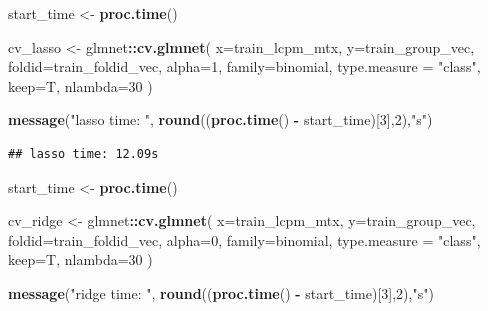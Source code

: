 \documentclass[
]{book}
\newenvironment{Shaded}{\begin{snugshade}}{\end{snugshade}}
\newcommand{\DataTypeTok}[1]{\textcolor[rgb]{0.13,0.29,0.53}{#1}}
\newcommand{\DecValTok}[1]{\textcolor[rgb]{0.00,0.00,0.81}{#1}}
\newcommand{\KeywordTok}[1]{\textcolor[rgb]{0.13,0.29,0.53}{\textbf{#1}}}
\newcommand{\NormalTok}[1]{#1}
\newcommand{\OperatorTok}[1]{\textcolor[rgb]{0.81,0.36,0.00}{\textbf{#1}}}
\newcommand{\StringTok}[1]{\textcolor[rgb]{0.31,0.60,0.02}{#1}}
\begin{document}
\begin{Shaded}
\begin{Highlighting}[]
\NormalTok{start\_time <{-}}\StringTok{  }\KeywordTok{proc.time}\NormalTok{()}

\NormalTok{cv\_lasso <{-}}\StringTok{ }\NormalTok{glmnet}\OperatorTok{::}\KeywordTok{cv.glmnet}\NormalTok{(}
 \DataTypeTok{x=}\NormalTok{train\_lcpm\_mtx,}
 \DataTypeTok{y=}\NormalTok{train\_group\_vec,}
 \DataTypeTok{foldid=}\NormalTok{train\_foldid\_vec,}
 \DataTypeTok{alpha=}\DecValTok{1}\NormalTok{,}
 \DataTypeTok{family=}\StringTok{\textquotesingle{}binomial\textquotesingle{}}\NormalTok{, }
 \DataTypeTok{type.measure =} \StringTok{"class"}\NormalTok{,}
 \DataTypeTok{keep=}\NormalTok{T,}
 \DataTypeTok{nlambda=}\DecValTok{30}
\NormalTok{)}

\KeywordTok{message}\NormalTok{(}\StringTok{"lasso time: "}\NormalTok{, }\KeywordTok{round}\NormalTok{((}\KeywordTok{proc.time}\NormalTok{() }\OperatorTok{{-}}\StringTok{ }\NormalTok{start\_time)[}\DecValTok{3}\NormalTok{],}\DecValTok{2}\NormalTok{),}\StringTok{"s"}\NormalTok{)}
\end{Highlighting}
\end{Shaded}

\begin{verbatim}
## lasso time: 12.09s
\end{verbatim}

\begin{Shaded}
\begin{Highlighting}[]
\NormalTok{start\_time <{-}}\StringTok{  }\KeywordTok{proc.time}\NormalTok{()}

\NormalTok{cv\_ridge <{-}}\StringTok{ }\NormalTok{glmnet}\OperatorTok{::}\KeywordTok{cv.glmnet}\NormalTok{(}
 \DataTypeTok{x=}\NormalTok{train\_lcpm\_mtx,}
 \DataTypeTok{y=}\NormalTok{train\_group\_vec,}
 \DataTypeTok{foldid=}\NormalTok{train\_foldid\_vec,}
 \DataTypeTok{alpha=}\DecValTok{0}\NormalTok{,}
 \DataTypeTok{family=}\StringTok{\textquotesingle{}binomial\textquotesingle{}}\NormalTok{, }
 \DataTypeTok{type.measure =} \StringTok{"class"}\NormalTok{,}
 \DataTypeTok{keep=}\NormalTok{T,}
 \DataTypeTok{nlambda=}\DecValTok{30}
\NormalTok{)}

\KeywordTok{message}\NormalTok{(}\StringTok{"ridge time: "}\NormalTok{, }\KeywordTok{round}\NormalTok{((}\KeywordTok{proc.time}\NormalTok{() }\OperatorTok{{-}}\StringTok{ }\NormalTok{start\_time)[}\DecValTok{3}\NormalTok{],}\DecValTok{2}\NormalTok{),}\StringTok{"s"}\NormalTok{)}
\end{Highlighting}
\end{Shaded}
\end{document}

